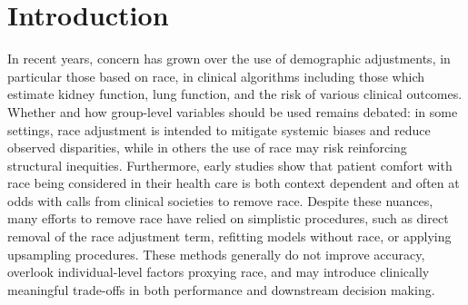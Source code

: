 \documentclass[10pt]{extarticle}
\begin{document}
\section{Introduction}\label{introduction}

In recent years, concern has grown over the use of demographic adjustments, in particular those based on race, in clinical algorithms including those which estimate kidney function, lung function, and the risk of various clinical outcomes\cite{Vyas2020-ht,Burchard2003-vs,Phimister2003-ee,Diao2024-lw,Vyas2022-ef}. Whether and how group-level variables should be used remains debated: in some settings, race adjustment is intended to mitigate systemic biases and reduce observed disparities, while in others the use of race may risk reinforcing structural inequities\cite{Roberts2021-iy,Bhakta2023-lv,Goodman2021-di,Inker2021-px,Baugh2022-fs,Coots2025-sq,Bonner2023-ms,Zink2024-rv,Basu2023-ot}. Furthermore, early studies show that patient comfort with race being considered in their health care is both context dependent and often at odds with calls from clinical societies to remove race\cite{Diao2025-ny}. Despite these nuances, many efforts to remove race have relied on simplistic procedures, such as direct removal of the race adjustment term, refitting models without race, or applying upsampling procedures\cite{Diao2021-ij,Diao2023-zh,Inker2021-px,Bhakta2023-lv,Bowerman2023-ff,Moffett2023-eq}. These methods generally do not improve accuracy, overlook individual-level factors proxying race, and may introduce clinically meaningful trade-offs in both performance and downstream decision making\cite{Diao2024-lw,Diao2021-ij}.
\end{document}
